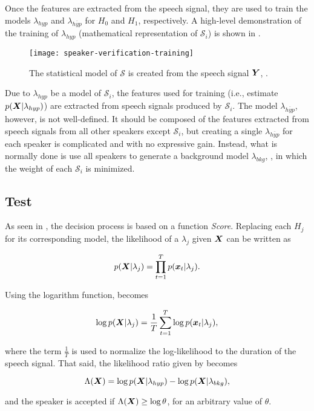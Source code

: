 Once the features are extracted from the speech signal, they are used to train the models $\lambda_{hyp}$ and $\lambda_{\overline{hyp}}$ for $H_0$ and $H_1$, respectively. A high-level demonstration of the training of $\lambda_{hyp}$ (mathematical representation of $\mathcal{S}_i$) is shown in .

\begin{figure}[ht]
    \centering
    \texttt{[image: speaker-verification-training]}
    \caption{The statistical model of $\mathcal{S}$ is created from the speech signal $\boldsymbol{Y}$, .}
    \label{fig:speaker-verification-training}
\end{figure}

Due to $\lambda_{hyp}$ be a model of $\mathcal{S}_i$, the features used for training (i.e., estimate $p(\boldsymbol{X}|\lambda_{hyp})$) are extracted from speech signals produced by $\mathcal{S}_i$. The model $\lambda_{\overline{hyp}}$, however, is not well-defined. It should be composed of the features extracted from speech signals from all other speakers except $\mathcal{S}_i$, but creating a single $\lambda_{\overline{hyp}}$ for each speaker is complicated and with no expressive gain. Instead, what is normally done is use all speakers to generate a background model $\lambda_{bkg}$, , in which the weight of each $\mathcal{S}_i$ is minimized.

\subsection{Test}

As seen in , the decision process is based on a function \emph{Score}. Replacing each $H_j$ for its corresponding model, the likelihood of a $\lambda_j$ given $\boldsymbol{X}$ can be written as

\begin{equation}
    p(\dvec{X}|\lambda_j) = \prod_{t=1}^T p(\dvec{x}_t|\lambda_j).
    \label{eq:likelihood-prod}
\end{equation}

\noindent Using the logarithm function,  becomes

\begin{equation}
    \log p(\dvec{X}|\lambda_j) = \frac{1}{T} \sum_{t=1}^T \log p(\dvec{x}_t|\lambda_j),
    \label{eq:log-likelihood-sum}
\end{equation}

\noindent where the term $\frac{1}{T}$ is used to normalize the log-likelihood to the duration of the speech signal. That said, the likelihood ratio given by  becomes

\begin{equation}
    \Lambda(\dvec{X}) = \log p(\dvec{X}|\lambda_{hyp}) - \log p(\dvec{X}|\lambda_{bkg}),
    \label{eq:score_of_X}
\end{equation}

\noindent and the speaker is accepted if $\Lambda(\boldsymbol{X}) \geq \log \theta$, for an arbitrary value of $\theta$.